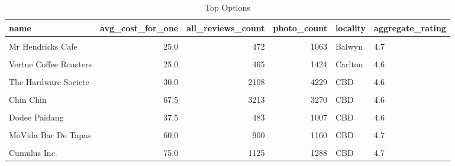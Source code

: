 \documentclass[11pt,a4paper,]{article}
\begin{document}
\begin{table}[!h]

\caption{\label{tab:rest-gluten-free}Top Options}
\centering
\fontsize{8}{10}\selectfont
\begin{tabular}[t]{l|r|r|r|l|l}
\hline
name & avg\_cost\_for\_one & all\_reviews\_count & photo\_count & locality & aggregate\_rating\\
\hline
\cellcolor{gray!6}{Jinda Thai Restaurant} & \cellcolor{gray!6}{40.0} & \cellcolor{gray!6}{1036} & \cellcolor{gray!6}{2478} & \cellcolor{gray!6}{Abbotsford} & \cellcolor{gray!6}{4.7}\\
\hline
Mr Hendricks Cafe & 25.0 & 472 & 1063 & Balwyn & 4.7\\
\hline
\cellcolor{gray!6}{Humble Rays} & \cellcolor{gray!6}{25.0} & \cellcolor{gray!6}{838} & \cellcolor{gray!6}{2566} & \cellcolor{gray!6}{Carlton} & \cellcolor{gray!6}{4.8}\\
\hline
Vertue Coffee Roasters & 25.0 & 465 & 1424 & Carlton & 4.6\\
\hline
\cellcolor{gray!6}{DOC Pizza \& Mozzarella Bar - Carlton} & \cellcolor{gray!6}{35.0} & \cellcolor{gray!6}{926} & \cellcolor{gray!6}{763} & \cellcolor{gray!6}{Carlton} & \cellcolor{gray!6}{4.6}\\
\hline
The Hardware Societe & 30.0 & 2108 & 4229 & CBD & 4.6\\
\hline
\cellcolor{gray!6}{Rice Paper Scissors} & \cellcolor{gray!6}{40.0} & \cellcolor{gray!6}{993} & \cellcolor{gray!6}{2891} & \cellcolor{gray!6}{CBD} & \cellcolor{gray!6}{4.8}\\
\hline
Chin Chin & 67.5 & 3213 & 3270 & CBD & 4.6\\
\hline
\cellcolor{gray!6}{Tipo 00} & \cellcolor{gray!6}{75.0} & \cellcolor{gray!6}{724} & \cellcolor{gray!6}{2129} & \cellcolor{gray!6}{CBD} & \cellcolor{gray!6}{4.9}\\
\hline
Dodee Paidang & 37.5 & 483 & 1007 & CBD & 4.6\\
\hline
\cellcolor{gray!6}{San Telmo} & \cellcolor{gray!6}{60.0} & \cellcolor{gray!6}{767} & \cellcolor{gray!6}{1208} & \cellcolor{gray!6}{CBD} & \cellcolor{gray!6}{4.6}\\
\hline
MoVida Bar De Tapas & 60.0 & 900 & 1160 & CBD & 4.7\\
\hline
\cellcolor{gray!6}{+39 Pizzeria} & \cellcolor{gray!6}{50.0} & \cellcolor{gray!6}{809} & \cellcolor{gray!6}{1185} & \cellcolor{gray!6}{CBD} & \cellcolor{gray!6}{4.6}\\
\hline
Cumulus Inc. & 75.0 & 1125 & 1288 & CBD & 4.7\\

\end{tabular}
\end{table}
\end{document}

